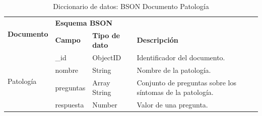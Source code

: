 \begin{table}[htpb]
\centering
\begin{tabularx}{\textwidth}{|l|X|X|X|X|}
\hline
\multirow{2}{*}{\textbf{Documento}} & \multicolumn{3}{l|}{\textbf{Esquema BSON}}                                                                                                                                                                                                           \\ \cline{2-4} 
                                    & \textbf{Campo}                       & \textbf{Tipo de dato}      & \textbf{Descripción}                                                                                                                                                             \\ \hline
\multirow{4}{*}{Patología}         & \_id         & ObjectID     & Identificador del documento.                              \\ \cline{2-4}
 & nombre       & String       & Nombre de la patología.                                   \\ \cline{2-4} 
                  & preguntas    & Array String & Conjunto de preguntas sobre los síntomas de la patología. \\ \cline{2-4} 
                  & respuesta    & Number       & Valor de una pregunta.                                    \\ \hline
\end{tabularx}
\caption{Diccionario de datos: BSON Documento Patología}
\label{fig:dic_datos_BSON_3}
\end{table}

